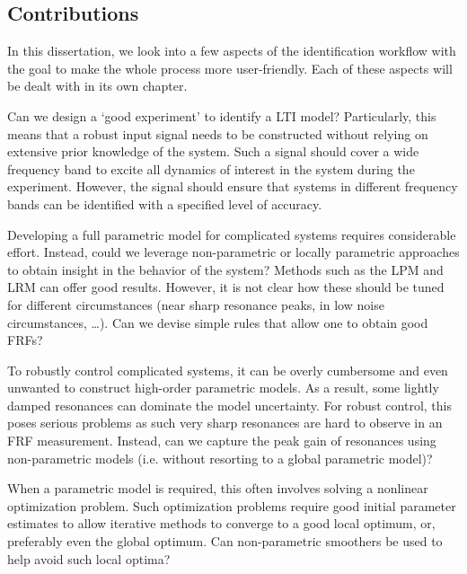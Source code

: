\subsection{Contributions}
In this dissertation, we look into a few aspects of the identification workflow with the goal to make the whole process more user-friendly.
Each of these aspects will be dealt with in its own chapter.

\begin{question}
Can we design a `good experiment' to identify a \gls{LTI} model?
Particularly, this means that a robust input signal needs to be constructed without relying on extensive prior knowledge of the system.
Such a signal should cover a wide frequency band to excite all dynamics of interest in the system during the experiment.
However, the signal should ensure that systems in different frequency bands can be identified with a specified level of accuracy.
\end{question}

\begin{question}
Developing a full parametric model for complicated systems requires considerable effort.
Instead, could we leverage non-parametric or locally parametric approaches to obtain insight in the behavior of the system?
Methods such as the \gls{LPM} and \gls{LRM} can offer good results.
However, it is not clear how these should be tuned for different circumstances (near sharp resonance peaks, in low noise circumstances, \ldots).
Can we devise simple rules that allow one to obtain good \glspl{FRF}?
\end{question}

\begin{question}
To robustly control complicated systems, it can be overly cumbersome and even unwanted to construct high-order parametric models.
As a result, some lightly damped resonances can dominate the model uncertainty.
For robust control, this poses serious problems as such very sharp resonances are hard to observe in an \gls{FRF} measurement.
Instead, can we capture the peak gain of resonances using non-parametric models (i.e. without resorting to a global parametric model)?
\end{question}

\begin{question}
When a parametric model is required, this often involves solving a nonlinear optimization problem.
Such optimization problems require good initial parameter estimates to allow iterative methods to converge to a good local optimum, or, preferably even the global optimum.
Can non-parametric smoothers be used to help avoid such local optima?
\end{question}

